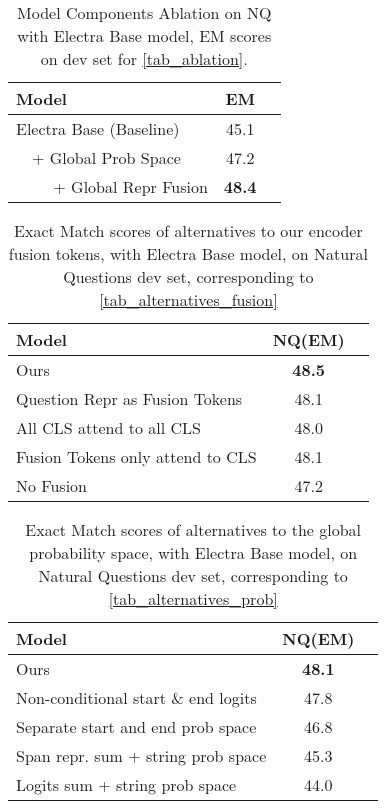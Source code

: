 \documentclass[11pt]{article}
\begin{document}
\begin{table}[h!]
\begin{center}
\begin{tabular}{lcc}
\toprule
\textbf{Model} & \textbf{EM}\\ 
\toprule
Electra Base (Baseline) & 45.1 \\
~~+ Global Prob Space & 47.2 \\
~~~~ + Global Repr Fusion & \textbf{48.4} \\
\bottomrule
\end{tabular}
\end{center}
\caption{Model Components Ablation on NQ with Electra Base model, EM scores on dev set for \cref{tab_ablation}.}
\label{tab_dev_ablation}
\end{table}


\begin{table}[h!]
\begin{center}
\begin{tabular}{lcc}
\toprule
\textbf{Model} & \textbf{NQ(EM)}\\ 
\toprule 
Ours & \textbf{48.5} \\
Question Repr as Fusion Tokens & 48.1 \\
All CLS attend to all CLS & 48.0 \\
Fusion Tokens only attend to CLS & 48.1 \\
No Fusion & 47.2 \\
\bottomrule
\end{tabular}
\end{center}
\caption{Exact Match scores of alternatives to our encoder fusion tokens, with Electra Base model, on Natural Questions dev set, corresponding to \cref{tab_alternatives_fusion}}
\label{tab_dev_alternatives_fusion}
\end{table}

\begin{table}[h!]
\begin{center}
\begin{tabular}{lcc}
\toprule
\textbf{Model} & \textbf{NQ(EM)}\\ 
\toprule 
Ours & \textbf{48.1} \\
Non-conditional start \& end logits & 47.8 \\
Separate start and end prob space & 46.8 \\
Span repr. sum + string prob space  & 45.3 \\
Logits sum + string prob space & 44.0 \\
\bottomrule
\end{tabular}
\end{center}
\caption{Exact Match scores of alternatives to the global probability space, with Electra Base model, on Natural Questions dev set, corresponding to \cref{tab_alternatives_prob}}
\label{tab_dev_alternatives_prob}
\end{table}
\end{document}
